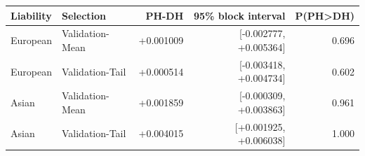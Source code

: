 \begin{tabular}{llrrr}
\toprule
Liability & Selection & PH-DH & 95\% block interval & P(PH>DH) \\
\midrule
European & Validation-Mean & +0.001009 & [-0.002777, +0.005364] & 0.696 \\
European & Validation-Tail & +0.000514 & [-0.003418, +0.004734] & 0.602 \\
Asian & Validation-Mean & +0.001859 & [-0.000309, +0.003863] & 0.961 \\
Asian & Validation-Tail & +0.004015 & [+0.001925, +0.006038] & 1.000 \\
\bottomrule
\end{tabular}
